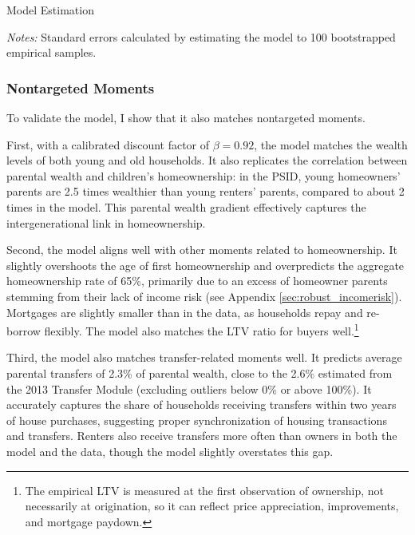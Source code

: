 \documentclass[12pt]{article}
\begin{document}
\begin{table}[tb]
	\center 
	\begin{threeparttable}
	\caption{Model Estimation}\label{tab:esttable}
		
	\end{threeparttable}
	{\begin{footnotesize}\begin{flushleft}\vspace{-0.1in}
		\textit{Notes:} Standard errors calculated by estimating the model to 100 bootstrapped empirical samples.
		\end{flushleft}\end{footnotesize}}
\end{table}
\subsubsection{Nontargeted Moments}\label{sec:externalval}
To validate the model, I show that it also matches nontargeted moments. 

First, with a calibrated discount factor of $\beta=0.92$, the model matches the wealth levels of both young and old households. It also replicates the correlation between parental wealth and children's homeownership: in the PSID, young homeowners' parents are 2.5 times wealthier than young renters' parents, compared to about 2 times in the model. This parental wealth gradient effectively captures the intergenerational link in homeownership.

Second, the model aligns well with other moments related to homeownership. It slightly overshoots the age of first homeownership and overpredicts the aggregate homeownership rate of 65\%, primarily due to an excess of homeowner parents stemming from their lack of income risk (see Appendix \ref{sec:robust_incomerisk}). Mortgages are slightly smaller than in the data, as households repay and re-borrow flexibly. The model also matches the LTV ratio for buyers well.\footnote{The empirical LTV is measured at the first observation of ownership, not necessarily at origination, so it can reflect price appreciation, improvements, and mortgage paydown.}

Third, the model also matches transfer-related moments well. It predicts average parental transfers of 2.3\% of parental wealth, close to the 2.6\% estimated from the 2013 Transfer Module (excluding outliers below 0\% or above 100\%). It accurately captures the share of households receiving transfers within two years of house purchases, suggesting proper synchronization of housing transactions and transfers. Renters also receive transfers more often than owners in both the model and the data, though the model slightly overstates this gap.
\end{document}
